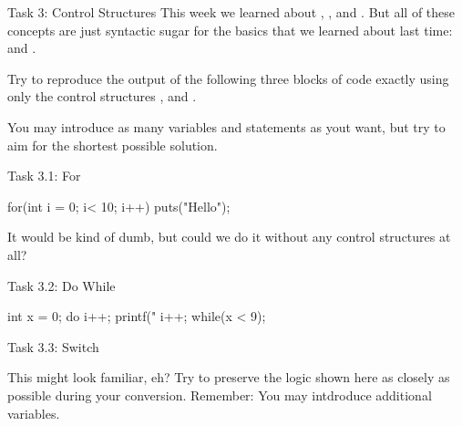 \documentclass[10pt,graphics,aspectratio=169,table]{beamer}
\begin{document}
\begin{frame}[fragile]{Task 3: Control Structures}
This week we learned about , , and .
But all of these concepts are just syntactic sugar for the basics that 
we learned about last time:  and .

Try to reproduce the output of the following three blocks of code exactly 
using only the control structures ,  and .

You may introduce as many variables and statements as yout want, 
but try to aim for the shortest possible solution. 
\end{frame}

\begin{frame}[fragile]{Task 3.1: For}
\begin{codeblock}
for(int i = 0; i< 10; i++){
    puts("Hello");
}
\end{codeblock}

It would be kind of dumb, but could we do it without
any control structures at all?

\end{frame}
\begin{frame}[fragile]{Task 3.2: Do While}
\begin{codeblock}
    int x = 0;
    do{
        i++;
        printf("%
        i++;
    }while(x < 9);
\end{codeblock}

\end{frame}
\begin{frame}[fragile]{Task 3.3: Switch}

This might look familiar, eh? Try to preserve the logic shown here 
as closely as possible during your conversion. 
Remember: You may intdroduce additional variables.
\end{frame}
\end{document}
